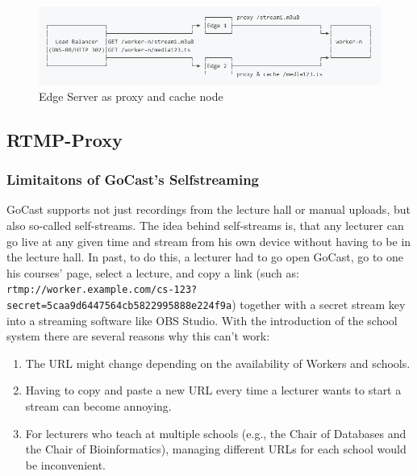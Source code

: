 \begin{figure}[htpb]
    \centering
    \includegraphics[width=\linewidth]{images/EdgeNetwork.png}
    \caption[Edge Server as proxy and cache node]{Edge Server as proxy and cache node}\label{fig:edge-network}
\end{figure}


\subsection{RTMP-Proxy}

\subsubsection{Limitaitons of GoCast's Selfstreaming}

GoCast supports not just recordings from the lecture hall or manual uploads, but also so-called self-streams. The idea behind self-streams is, that any lecturer can go live at any given time and stream from his own device without having to be in the lecture hall. In past, to do this, a lecturer had to go open GoCast, go to one his courses' page, select a lecture, and copy a link (such as: \texttt{rtmp://worker.example.com/cs-123? secret=5caa9d6447564cb5822995888e224f9a}) together with a secret stream key into a streaming software like OBS Studio. With the introduction of the school system there are several reasons why this can't work:

\begin{enumerate}
    \item The URL might change depending on the availability of Workers and schools.
    \item Having to copy and paste a new URL every time a lecturer wants to start a stream can become annoying.
    \item For lecturers who teach at multiple schools (e.g., the Chair of Databases and the Chair of Bioinformatics), managing different URLs for each school would be inconvenient.
\end{enumerate}

